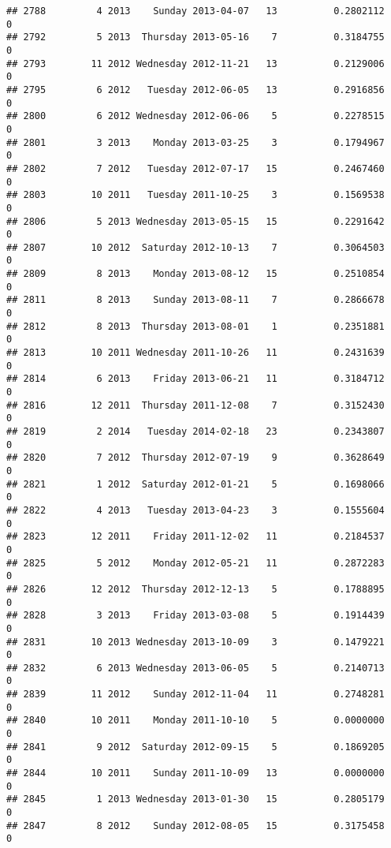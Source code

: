 \documentclass[
]{article}
\begin{document}
\begin{verbatim}
## 2788         4 2013    Sunday 2013-04-07   13          0.2802112             0
## 2792         5 2013  Thursday 2013-05-16    7          0.3184755             0
## 2793        11 2012 Wednesday 2012-11-21   13          0.2129006             0
## 2795         6 2012   Tuesday 2012-06-05   13          0.2916856             0
## 2800         6 2012 Wednesday 2012-06-06    5          0.2278515             0
## 2801         3 2013    Monday 2013-03-25    3          0.1794967             0
## 2802         7 2012   Tuesday 2012-07-17   15          0.2467460             0
## 2803        10 2011   Tuesday 2011-10-25    3          0.1569538             0
## 2806         5 2013 Wednesday 2013-05-15   15          0.2291642             0
## 2807        10 2012  Saturday 2012-10-13    7          0.3064503             0
## 2809         8 2013    Monday 2013-08-12   15          0.2510854             0
## 2811         8 2013    Sunday 2013-08-11    7          0.2866678             0
## 2812         8 2013  Thursday 2013-08-01    1          0.2351881             0
## 2813        10 2011 Wednesday 2011-10-26   11          0.2431639             0
## 2814         6 2013    Friday 2013-06-21   11          0.3184712             0
## 2816        12 2011  Thursday 2011-12-08    7          0.3152430             0
## 2819         2 2014   Tuesday 2014-02-18   23          0.2343807             0
## 2820         7 2012  Thursday 2012-07-19    9          0.3628649             0
## 2821         1 2012  Saturday 2012-01-21    5          0.1698066             0
## 2822         4 2013   Tuesday 2013-04-23    3          0.1555604             0
## 2823        12 2011    Friday 2011-12-02   11          0.2184537             0
## 2825         5 2012    Monday 2012-05-21   11          0.2872283             0
## 2826        12 2012  Thursday 2012-12-13    5          0.1788895             0
## 2828         3 2013    Friday 2013-03-08    5          0.1914439             0
## 2831        10 2013 Wednesday 2013-10-09    3          0.1479221             0
## 2832         6 2013 Wednesday 2013-06-05    5          0.2140713             0
## 2839        11 2012    Sunday 2012-11-04   11          0.2748281             0
## 2840        10 2011    Monday 2011-10-10    5          0.0000000             0
## 2841         9 2012  Saturday 2012-09-15    5          0.1869205             0
## 2844        10 2011    Sunday 2011-10-09   13          0.0000000             0
## 2845         1 2013 Wednesday 2013-01-30   15          0.2805179             0
## 2847         8 2012    Sunday 2012-08-05   15          0.3175458             0

\end{verbatim}
\end{document}
